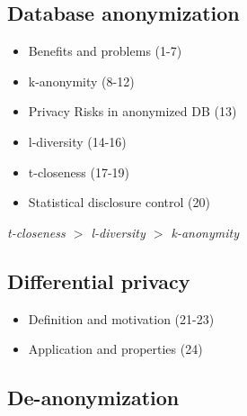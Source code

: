 \documentclass[../overview.tex]{subfiles}
\begin{document}
\subsection{Database anonymization}
\begin{itemize}
	\item Benefits and problems (1-7)
	\item k-anonymity (8-12)
	\item Privacy Risks in anonymized DB (13)
	\item l-diversity (14-16)
	\item t-closeness (17-19)
	\item Statistical disclosure control (20)
\end{itemize}
\emph{t-closeness $>$ l-diversity $>$ k-anonymity}

\subsection{Differential privacy}
\begin{itemize}
		\item Definition and motivation (21-23)
		\item Application and properties (24)
\end{itemize}

\subsection{De-anonymization}
\end{document}
